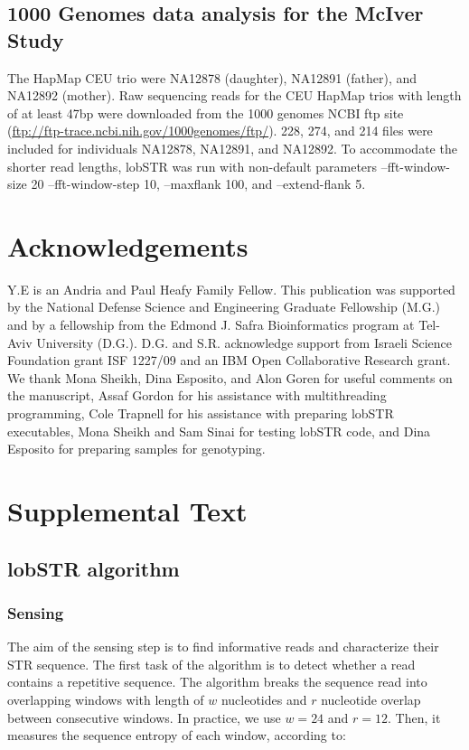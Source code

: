 \subsection{1000 Genomes data analysis for the McIver Study}
The HapMap CEU trio were NA12878 (daughter), NA12891 (father), and NA12892 (mother). Raw sequencing reads for the CEU HapMap trios with length of at least 47bp were downloaded from the 1000 genomes NCBI ftp site (\url{ftp://ftp-trace.ncbi.nih.gov/1000genomes/ftp/}). 228, 274, and 214 files were included for individuals NA12878, NA12891, and NA12892. To accommodate the shorter read lengths, lobSTR was run with non-default parameters –fft-window-size 20 –fft-window-step 10, --maxflank 100, and –extend-flank 5. 

\section{Acknowledgements}
Y.E is an Andria and Paul Heafy Family Fellow. This publication was supported by the National Defense Science and Engineering Graduate Fellowship (M.G.) and by a fellowship from the Edmond J. Safra Bioinformatics program at Tel-Aviv University (D.G.). D.G. and S.R. acknowledge support from Israeli Science Foundation grant ISF 1227/09 and an IBM Open Collaborative Research grant. We thank Mona Sheikh, Dina Esposito, and Alon Goren for useful comments on the manuscript, Assaf Gordon for his assistance with multithreading programming, Cole Trapnell for his assistance with preparing lobSTR executables, Mona Sheikh and Sam Sinai for testing lobSTR code, and Dina Esposito for preparing samples for genotyping. 

\section{Supplemental Text}
\label{sec:lobsupptext}
\subsection{lobSTR algorithm}

\subsubsection{Sensing}
The aim of the sensing step is to find informative reads and characterize their STR sequence. The first task of the algorithm is to detect whether a read contains a repetitive sequence. The algorithm breaks the sequence read into overlapping windows with length of $w$ nucleotides and $r$ nucleotide overlap between consecutive windows. In practice, we use $w=24$ and $r=12$. Then, it measures the sequence entropy of each window, according to:

